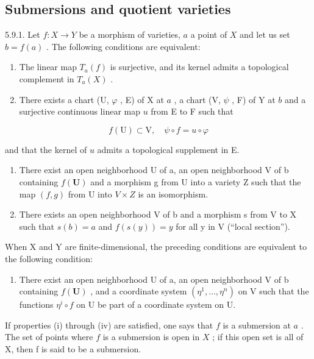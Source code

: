 \subsection{Submersions and quotient varieties}

5.9.1. Let \(f: X \to Y\) be a morphism of varieties, \(a\) a point of \(X\) and let us set \(b = f(a)\) . The following conditions are equivalent:

\begin{enumerate}
\def\labelenumi{(\roman{enumi})}
\item
  The linear map \(T_{a}(f)\) is surjective, and its kernel admits a topological complement in \(T_{a}(X)\) .
\item
  There exists a chart (U, \(\varphi\) , E) of X at \(a\) , a chart (V, \(\psi\) , F) of Y at \(b\) and a surjective continuous linear map \(u\) from E to F such that
\end{enumerate}

\[
f (\mathrm{U}) \subset \mathrm{V}, \quad \psi \circ f = u \circ \varphi
\]

and that the kernel of \(u\) admits a topological supplement in E.

\begin{enumerate}
\def\labelenumi{(\roman{enumi})}
\setcounter{enumi}{2}
\item
  There exist an open neighborhood U of a, an open neighborhood V of b containing \(f(\mathbf{U})\) and a morphism g from U into a variety Z such that the map \((f,g)\) from U into \(V \times Z\) is an isomorphism.
\item
  There exists an open neighborhood V of b and a morphism s from V to X such that \(s(b) = a\) and \(f(s(y)) = y\) for all y in V (“local section”).
\end{enumerate}

When X and Y are finite-dimensional, the preceding conditions are equivalent to the following condition:

\begin{enumerate}
\def\labelenumi{(\alph{enumi})}
\setcounter{enumi}{21}
\tightlist
\item
  There exist an open neighborhood U of a, an open neighborhood V of b containing \(f(\mathbf{U})\) , and a coordinate system \((\eta^{1},\ldots,\eta^{n})\) on V such that the functions \(\eta^{i}\circ f\) on U be part of a coordinate system on U.
\end{enumerate}

If properties (i) through (iv) are satisfied, one says that \(f\) is a submersion at \(a\) . The set of points where \(f\) is a submersion is open in \(X\) ; if this open set is all of X, then f is said to be a submersion.

